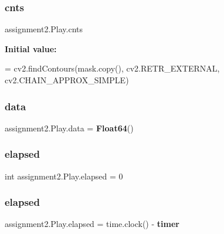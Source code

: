 \mbox{\label{classassignment2_1_1_play_ad553ca32dfa683eccfb2b17d84a245dc}} 
\subsubsection{cnts}
{\footnotesize\ttfamily assignment2.\+Play.\+cnts\hspace{0.3cm}{\ttfamily [static]}}

{\bfseries Initial value\+:}
\begin{DoxyCode}
=  cv2.findContours(mask.copy(), cv2.RETR\_EXTERNAL,
                        cv2.CHAIN\_APPROX\_SIMPLE)
\end{DoxyCode}
\mbox{\label{classassignment2_1_1_play_a50d8659a1cc8794cbafd6da73f1a58dc}} 
\subsubsection{data}
{\footnotesize\ttfamily assignment2.\+Play.\+data = \textbf{ Float64}()\hspace{0.3cm}{\ttfamily [static]}}

\mbox{\label{classassignment2_1_1_play_a9c6969a879eb4e4020cea4b9eaaeead3}} 
\subsubsection{elapsed\hspace{0.1cm}{\footnotesize\ttfamily [1/2]}}
{\footnotesize\ttfamily int assignment2.\+Play.\+elapsed = 0\hspace{0.3cm}{\ttfamily [static]}}

\mbox{\label{classassignment2_1_1_play_aa02782ff20ca17a69c9636e68cf916a9}} 
\subsubsection{elapsed\hspace{0.1cm}{\footnotesize\ttfamily [2/2]}}
{\footnotesize\ttfamily assignment2.\+Play.\+elapsed = time.\+clock() -\/ \textbf{ timer}\hspace{0.3cm}{\ttfamily [static]}}

